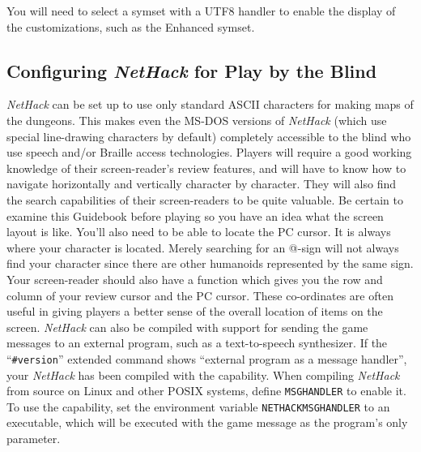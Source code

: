 \documentclass[titlepage]{article}
\begin{document}
You will need to select a symset with a UTF8 handler to enable the
display of the customizations, such as the Enhanced symset.

\subsection*{Configuring \textit{NetHack} for Play by the Blind}

\textit{NetHack} can be set up to use only standard ASCII characters for making
maps of the dungeons. This makes even the MS-DOS versions of \textit{NetHack}
(which use special line-drawing characters by default) completely
accessible to the blind who use speech and/or Braille access technologies.
Players will require a good working knowledge of their screen-reader's
review features, and will have to know how to navigate horizontally and
vertically character by character. They will also find the search
capabilities of their screen-readers to be quite valuable. Be certain to
examine this Guidebook before playing so you have an idea what the screen
layout is like. You'll also need to be able to locate the PC cursor. It is
always where your character is located. Merely searching for an @-sign will
not always find your character since there are other humanoids represented
by the same sign. Your screen-reader should also have a function which
gives you the row and column of your review cursor and the PC cursor.
These co-ordinates are often useful in giving players a better sense of the
overall location of items on the screen.
\textit{NetHack} can also be compiled with support for sending the game
messages to an external program, such as a text-to-speech synthesizer. If
the ``\texttt{\#version}'' extended command shows ``external program as a
message handler'', your \textit{NetHack}
has been compiled with the capability. When compiling \textit{NetHack}
from source
on Linux and other POSIX systems, define \texttt{MSGHANDLER} to enable it.
To use
the capability, set the environment variable \texttt{NETHACK\textunderscore MSGHANDLER} to
an executable, which will be executed with the game message as the program's
only parameter.
\end{document}
